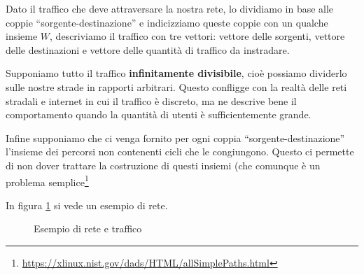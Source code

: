 \documentclass[a4paper]{article}
\theoremstyle{plain}
\theoremstyle{definition}
\theoremstyle{remark}
\begin{document}
Dato il traffico che deve attraversare la nostra rete, lo dividiamo in
base alle coppie ``sorgente-destinazione'' e indicizziamo queste
coppie con un qualche insieme $W$, descriviamo il traffico con tre
vettori: vettore delle sorgenti, vettore delle destinazioni e vettore
delle quantità di traffico da instradare.

Supponiamo tutto il traffico \textbf{infinitamente divisibile}, cioè
possiamo dividerlo sulle nostre strade in rapporti arbitrari. Questo
confligge con la realtà delle reti stradali e internet in cui il
traffico è discreto, ma ne descrive bene il comportamento quando la
quantità di utenti è sufficientemente grande.

Infine supponiamo che ci venga fornito per ogni coppia
``sorgente-destinazione'' l'insieme dei percorsi non contenenti cicli
che le congiungono. Questo ci permette di non dover trattare la
costruzione di questi insiemi (che comunque è un problema
semplice\footnote{\url{https://xlinux.nist.gov/dads/HTML/allSimplePaths.html}}

In figura \ref{fig:esempio-rete} si vede un esempio di rete.

\begin{figure}[ht]
  \centering
  \caption{Esempio di rete e traffico}
  \label{fig:esempio-rete}
\end{figure}
\end{document}
